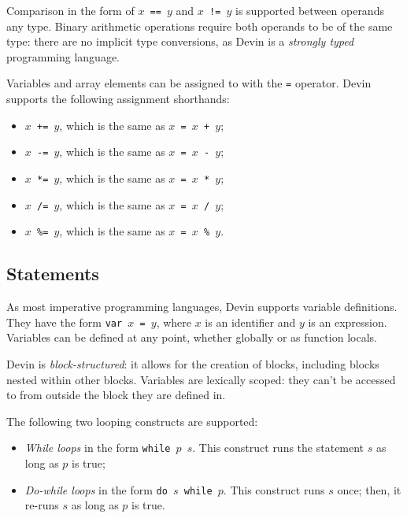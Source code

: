 \documentclass[11pt, american, draft]{PhdThesis}
\begin{document}
  Comparison in the form of \mbox{\texttt{$x$ == $y$}} and \mbox{\texttt{$x$ != $y$}} is supported
  between operands any type. Binary arithmetic operations require both operands to be of the same
  type: there are no implicit type conversions, as Devin is a \emph{strongly typed} programming
  language.

  Variables and array elements can be assigned to with the \verb$=$ operator. Devin supports the
  following assignment shorthands:

  \begin{itemize}[noitemsep,topsep=0pt]
    \item \mbox{\texttt{$x$ += $y$}}, which is the same as \mbox{\texttt{$x$ = $x$ + $y$}};
    \item \mbox{\texttt{$x$ -= $y$}}, which is the same as \mbox{\texttt{$x$ = $x$ - $y$}};
    \item \mbox{\texttt{$x$ *= $y$}}, which is the same as \mbox{\texttt{$x$ = $x$ * $y$}};
    \item \mbox{\texttt{$x$ /= $y$}}, which is the same as \mbox{\texttt{$x$ = $x$ / $y$}};
    \item \mbox{\texttt{$x$ \%= $y$}}, which is the same as \mbox{\texttt{$x$ = $x$ \% $y$}}.
  \end{itemize}

  \subsection{Statements}

  As most imperative programming languages, Devin supports variable definitions. They have the form
  \mbox{\texttt{var $x$ = $y$}}, where $x$ is an identifier and $y$ is an expression. Variables can
  be defined at any point, whether globally or as function locals.

  Devin is \emph{block-structured}: it allows for the creation of blocks, including blocks nested
  within other blocks. Variables are lexically scoped: they can't be accessed to from outside the
  block they are defined in.

  The following two looping constructs are supported:

  \begin{itemize}[noitemsep,topsep=0pt]
    \item \emph{While loops} in the form \mbox{\texttt{while $p$ $s$}}. This construct runs the
          statement $s$ as long as $p$ is true;

    \item \emph{Do-while loops} in the form \mbox{\texttt{do $s$ while $p$}}. This construct runs
          $s$ once; then, it re-runs $s$ as long as $p$ is true.
  \end{itemize}
\end{document}
